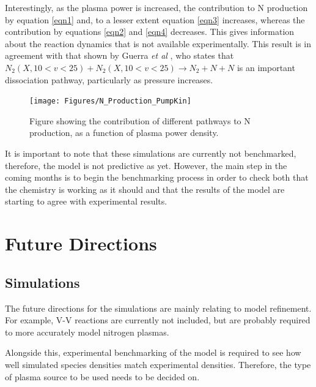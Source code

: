 \documentclass[11pt, oneside]{article}   	%
\begin{document}
Interestingly, as the plasma power is increased, the contribution to N production by equation \ref{eqn1} and, to a lesser extent equation \ref{eqn3} increases, whereas the contribution by equations \ref{eqn2} and \ref{eqn4} decreases.
This gives information about the reaction dynamics that is not available experimentally.
This result is in agreement with that shown by Guerra \textit{et al} \cite{Guerra2004kinetic}, who states that $N_2(X, 10<v<25) + N_2(X, 10<v<25) \rightarrow N_2 + N + N $ is an important dissociation pathway, particularly as pressure increases.

\begin{figure}
\centering
\texttt{[image: Figures/N\_Production\_PumpKin]}
\caption{Figure showing the contribution of different pathways to N production, as a function of plasma power density.}
\label{fig:pumpkin}
\end{figure}

It is important to note that these simulations are currently not benchmarked, therefore, the model is not predictive as yet.
However, the main step in the coming months is to begin the benchmarking process in order to check both that the chemistry is working as it should and that the results of the model are starting to agree with experimental results.

\section{Future Directions}
\subsection{Simulations}
The future directions for the simulations are mainly relating to model refinement.
For example, V-V reactions are currently not included, but are probably required to more accurately model nitrogen plasmas.

Alongside this, experimental benchmarking of the model is required to see how well simulated species densities match experimental densities.
Therefore, the type of plasma source to be used needs to be decided on.
\end{document}
